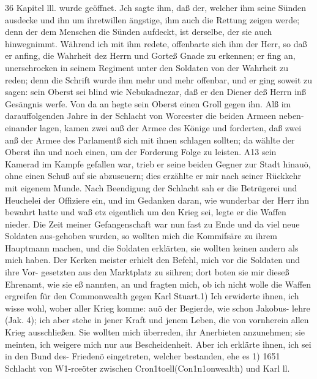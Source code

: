 36 Kapitel lll.
wurde geöffnet. Jch sagte ihm, daß der, welcher ihm seine Sünden
ausdecke und ihn um ihretwillen ängstige, ihm auch die Rettung
zeigen werde; denn der dem Menschen die Sünden aufdeckt, ist
derselbe, der sie auch hinwegnimmt. Während ich mit ihm redete,
offenbarte sich ihm der Herr, so daß er anfing, die Wahrheit dez
Herrn und Gorteß Gnade zu erkennen; er fing an, unerschrocken
in seinem Regiment unter den Soldaten von der Wahrheit zu
reden; denn die Schrift wurde ihm mehr und mehr offenbar, und
er ging soweit zu sagen: sein Oberst sei blind wie Nebukadnezar,
daß er den Diener deß Herrn inß Gesängnis werfe. Von da an
hegte sein Oberst einen Groll gegen ihn. Alß im darauffolgenden
Jahre in der Schlacht von Worcester die beiden Armeen neben-
einander lagen, kamen zwei auß der Armee des Könige und
forderten, daß zwei anß der Armee des Parlamentß sich mit ihnen
schlagen sollten; da wählte der Oberst ihn und noch einen, um
der Forderung Folge zu leisten. A13 sein Kamerad im Kampfe
gefallen war, trieb er seine beiden Gegner zur Stadt hinauö, ohne
einen Schuß auf sie abzuseuern; dies erzählte er mir nach seiner
Rückkehr mit eigenem Munde. Nach Beendigung der Schlacht
sah er die Betrügerei und Heuchelei der Offiziere ein, und im
Gedanken daran, wie wunderbar der Herr ihn bewahrt hatte und
waß etz eigentlich um den Krieg sei, legte er die Waffen nieder.
Die Zeit meiner Gefangenschaft war nun fast zu Ende und
da viel neue Soldaten aus-gehoben wurden, so wollten mich die
Kommifsäre zu ihrem Hauptmann machen, und die Soldaten
erklärten, sie wollten keinen andern als mich haben. Der Kerken
meister erhielt den Befehl, mich vor die Soldaten und ihre Vor-
gesetzten aus den Marktplatz zu siihren; dort boten sie mir dieseß
Ehrenamt, wie sie eß nannten, an und fragten mich, ob ich nicht
wolle die Waffen ergreifen für den Commonwealth gegen Karl
Stuart.1) Ich erwiderte ihnen, ich wisse wohl, woher aller
Krieg komme: auö der Begierde, wie schon Jakobus- lehre
(Jak. 4); ich aber stehe in jener Kraft und jenem Leben,
die von vornherein allen Krieg ausschließen. Sie wollten mich
überreden, ihr Anerbieten anzunehmen; sie meinten, ich weigere
mich nur aus Bescheidenheit. Aber ich erklärte ihnen, ich sei in
den Bund des- Friedenö eingetreten, welcher bestanden, ehe es
1) 1651 Schlacht von W1-rceöter zwischen Cron1toell(Con1n1onwealth) und
Karl ll.


